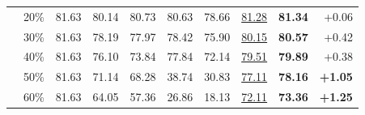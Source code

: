 \begin{table}[H]
\begin{tabular}{@{}lrrrrrrrrr@{}}
      & 20\% & 81.63 & 80.14 & 80.73 & 80.63 & 78.66 & \underline{81.28} & \textbf{81.34} & +0.06 \\
      & 30\% & 81.63 & 78.19 & 77.97 & 78.42 & 75.90 & \underline{80.15} & \textbf{80.57} & +0.42 \\
      & 40\% & 81.63 & 76.10 & 73.84 & 77.84 & 72.14 & \underline{79.51} & \textbf{79.89} & +0.38 \\
      & 50\% & 81.63 & 71.14 & 68.28 & 38.74 & 30.83 & \underline{77.11} & \textbf{78.16} & \textbf{+1.05} \\
      & 60\% & 81.63 & 64.05 & 57.36 & 26.86 & 18.13 & \underline{72.11} & \textbf{73.36} & \textbf{+1.25} \\
    \bottomrule
  \end{tabular}
\end{table}
